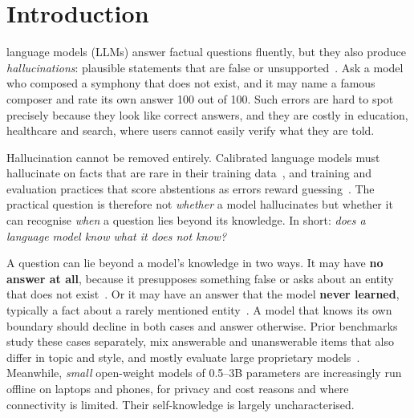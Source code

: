 \section{Introduction}
\label{sec:intro}

 language models (LLMs) answer factual questions fluently, but they also produce \emph{hallucinations}: plausible statements that are false or unsupported~\cite{ji2023survey,huang2025survey}. Ask a model who composed a symphony that does not exist, and it may name a famous composer and rate its own answer 100 out of 100. Such errors are hard to spot precisely because they look like correct answers, and they are costly in education, healthcare and search, where users cannot easily verify what they are told.

Hallucination cannot be removed entirely. Calibrated language models must hallucinate on facts that are rare in their training data~\cite{kalai2024calibrated}, and training and evaluation practices that score abstentions as errors reward guessing~\cite{kalai2025why}. The practical question is therefore not \emph{whether} a model hallucinates but whether it can recognise \emph{when} a question lies beyond its knowledge. In short: \emph{does a language model know what it does not know?}

A question can lie beyond a model's knowledge in two ways. It may have \textbf{no answer at all}, because it presupposes something false or asks about an entity that does not exist~\cite{kim2023qa2,hu2023falseqa}. Or it may have an answer that the model \textbf{never learned}, typically a fact about a rarely mentioned entity~\cite{mallen2023popqa,kandpal2023longtail}. A model that knows its own boundary should decline in both cases and answer otherwise. Prior benchmarks study these cases separately, mix answerable and unanswerable items that also differ in topic and style, and mostly evaluate large proprietary models~\cite{yin2023selfaware,amayuelas2024kuq,kirichenko2025abstentionbench}. Meanwhile, \emph{small} open-weight models of 0.5--3B parameters are increasingly run offline on laptops and phones, for privacy and cost reasons and where connectivity is limited. Their self-knowledge is largely uncharacterised.

